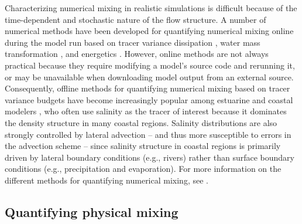 \documentclass[draft]{agujournal2019}
\begin{document}
Characterizing numerical mixing in realistic simulations is difficult because of the time-dependent and stochastic nature of the flow structure. A number of numerical methods have been developed for quantifying numerical mixing online during the model run based on tracer variance dissipation \cite{Burchard_2008, Klingbeil_2014}, water mass transformation \cite{Holmes_2021, lee2002spurious, megann2018estimating}, and energetics \cite{Ilicak_2012, Petersen_2015, winters1995available}. However, online methods are not always practical because they require modifying a model's source code and rerunning it, or may be unavailable when downloading model output from an external source. Consequently, offline methods for quantifying numerical mixing based on tracer variance budgets have become increasingly popular among estuarine and coastal modelers \cite{Li_2018, MacCready_2018, Wang_2017, Wang_2021}, who often use salinity as the tracer of interest because it dominates the density structure in many coastal regions. Salinity distributions are also strongly controlled by lateral advection -- and thus more susceptible to errors in the advection scheme -- since salinity structure in coastal regions is primarily driven by lateral boundary conditions (e.g., rivers) rather than surface boundary conditions (e.g., precipitation and evaporation). For more information on the different methods for quantifying numerical mixing, see .

\subsection{Quantifying physical mixing}
\end{document}
